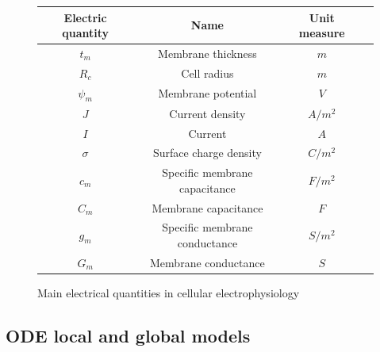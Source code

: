 \documentclass[12pt, a4paper]{article}
\begin{document}
\begin{figure}[H]
	\begin{center}
		\begin{tabular}{ |c|c|c|c| } 
			\hline
			\textbf{Electric quantity} & \textbf{Name} & \textbf{Unit measure} \\
			\hline
			$t_m$ & Membrane thickness & $m$ \\ 
			\hline
			$R_c$ & Cell radius & $m$ \\
			\hline
			$\psi_m$ & Membrane potential & $V$ \\
			\hline
			$J$ & Current density & $A/m^2$ \\
			\hline
			$I$ & Current & $A$ \\
			\hline
			$\sigma$ & Surface charge density & $C/m^2$ \\
			\hline
			$c_m$ & Specific membrane capacitance & $F/m^2$ \\
			\hline
			$C_m$ & Membrane capacitance & $F$ \\
			\hline
			$g_m$ & Specific membrane conductance & $S/m^2$ \\
			\hline
			$G_m$ & Membrane conductance & $S$ \\
			
			\hline
		\end{tabular}
		
	\end{center}
	\caption{Main electrical quantities in cellular electrophysiology}
\end{figure}


\subsection{ODE local and global models}
\end{document}
